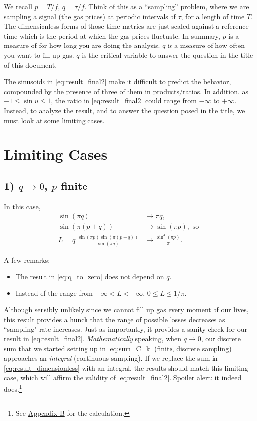 \documentclass[11pt]{article}
\begin{document}
\par
We recall $p = T / f$, $q = \tau / f$. Think of this as a ``sampling'' problem, where we are sampling a signal (the gas prices) at periodic intervals of $\tau$, for a length of time $T$. The dimensionless forms of those time metrics are just scaled against a reference time which is the period at which the gas prices fluctuate. In summary, $p$ is a measure of for how long you are doing the analysis. $q$ is a measure of how often you want to fill up gas. $q$ is the critical variable to answer the question in the title of this document. \\

\par
The sinusoids in \eqref{eq:result_final2} make it difficult to predict the behavior, compounded by the presence of three of them in products/ratios. In addition, as $-1 \leq \sin u \leq 1$, the ratio in \eqref{eq:result_final2} could range from $-\infty$ to $+\infty$. Instead, to analyze the result, and to answer the question posed in the title, we must look at some limiting cases.

\section*{Limiting Cases}
\label{sec:limiting_cases}

\subsection*{1) $q \rightarrow 0$, $p$ finite}
In this case,
\begin{align}
\sin (\pi q) &\rightarrow \pi q, \nonumber\\
\sin (\pi(p+q))  &\rightarrow \sin(\pi p), \text{ so} \nonumber\\[0.5em]
L = q \: \frac{\sin(\pi p) \sin(\pi (p+q))}{\sin(\pi q)} &\rightarrow \frac{\sin^2(\pi p)}{\pi}. \label{eq:q_to_zero}
\end{align}

A few remarks:
\begin{itemize}
	\item The result in \eqref{eq:q_to_zero} does not depend on $q$.
	\item Instead of the range from $-\infty < L < +\infty$, $ 0 \leq L \leq 1/\pi$. \\
\end{itemize} 

\par 
Although sensibly unlikely since we cannot fill up gas every moment of our lives, this result provides a hunch that the range of possible losses decreases as ``sampling" rate increases. Just as importantly, it provides a sanity-check for our result in \eqref{eq:result_final2}. \textit{Mathematically} speaking, when $q \rightarrow 0$, our discrete sum that we started setting up in \eqref{eq:sum_C_k} (finite, discrete sampling) approaches an \textit{integral} (continuous sampling). If we replace the sum in \eqref{eq:result_dimensionless} with an integral, the results should match this limiting case, which will affirm the validity of \eqref{eq:result_final2}. Spoiler alert: it indeed does.\footnote{See \hyperref[subsec:sum_to_int]{Appendix B} for the calculation.}
\end{document}
